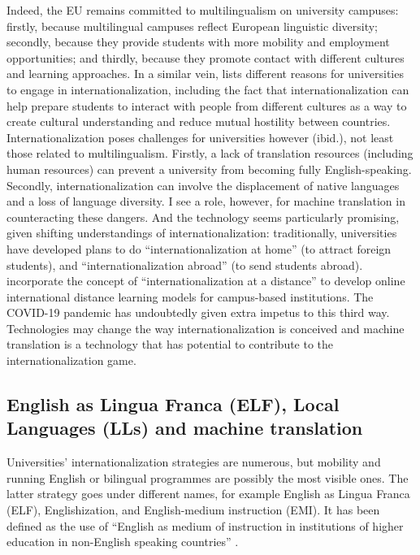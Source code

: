 \documentclass[output=paper]{langscibook}
\begin{document}
Indeed, the EU remains committed to multilingualism on university campuses: firstly, because multilingual campuses reflect European linguistic diversity; secondly, because they provide students with more mobility and employment opportunities; and thirdly, because they promote contact with different cultures and learning approaches. In a similar vein, \citet{Gao2019} lists different reasons for universities to engage in internationalization, including the fact that internationalization can help prepare students to interact with people from different cultures as a way to create cultural understanding and reduce mutual hostility between countries.  Internationalization poses challenges for universities however (ibid.), not least those related to multilingualism. Firstly, a lack of translation resources (including human resources) can prevent a university from becoming fully English-speaking. Secondly, internationalization can involve the displacement of native languages and a loss of language diversity. I see a role, however, for machine translation in counteracting these dangers. And the technology seems particularly promising, given shifting understandings of internationalization: traditionally, universities have developed plans to do “internationalization at home” (to attract foreign students), and “internationalization abroad” (to send students abroad). \citet{MittelmeierRaghuram2020} incorporate the concept of “internationalization at a distance” to develop online international distance learning models for campus-based institutions. The COVID-19 pandemic has undoubtedly given extra impetus to this third way. Technologies may change the way internationalization is conceived and machine translation is a technology that has potential to contribute to the internationalization game.

\subsection{English as Lingua Franca (ELF), Local Languages (LLs) and machine translation}

Universities’ internationalization strategies are numerous, but mobility and running English or bilingual programmes are possibly the most visible ones.  The latter strategy goes under different names, for example English as Lingua Franca (ELF), Englishization, and English-medium instruction (EMI). It has been defined as the use of “English as medium of instruction in institutions of higher education in non-English speaking countries” \citep{MultilingualHigherEducation2016}.
\end{document}
